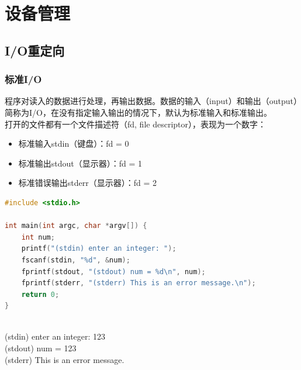 \chapter{设备管理}

\section{I/O重定向}

\subsection{标准I/O}

程序对读入的数据进行处理，再输出数据。数据的输入（input）和输出（output）简称为I/O，在没有指定输入输出的情况下，默认为标准输入和标准输出。 \\

打开的文件都有一个文件描述符（fd, file descriptor），表现为一个数字：

\begin{itemize}
	\item 标准输入stdin（键盘）：fd = 0
	\item 标准输出stdout（显示器）：fd = 1
	\item 标准错误输出stderr（显示器）：fd = 2
\end{itemize}

\begin{lstlisting}[language=C, title=标准I/O]
#include <stdio.h>

int main(int argc, char *argv[]) {
    int num;
    printf("(stdin) enter an integer: ");
    fscanf(stdin, "%d", &num);
    fprintf(stdout, "(stdout) num = %d\n", num);
    fprintf(stderr, "(stderr) This is an error message.\n");
    return 0;
}
\end{lstlisting}

\begin{tcolorbox}
	 \\
	(stdin) enter an integer: 123 \\
	(stdout) num = 123 \\
	(stderr) This is an error message.
\end{tcolorbox}

